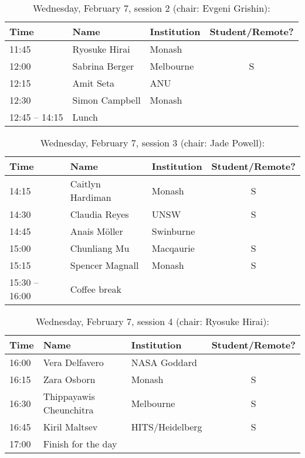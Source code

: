 \documentclass[amsmath,onecolumn]{revtex4-1}
\begin{document}
\begin{table}[!htbp]
	\centering
	\caption{Wednesday, February 7, session 2 (chair: Evgeni Grishin):}
\begin{tabular}{| l | l | l | c |}
	\hline
	Time & Name  & Institution & Student/Remote? \\ 		
	\hline
	11:45 & Ryosuke	Hirai & Monash & \\
	12:00 & Sabrina	Berger & Melbourne & S \\
	12:15 & Amit Seta & ANU & \\
	12:30 & Simon	Campbell & Monash & \\
	\hline
	12:45 -- 14:15 & Lunch & &  \\
	\hline
\end{tabular}
\end{table}

\begin{table}[!htbp]
	\centering
	\caption{Wednesday, February 7, session 3 (chair: Jade Powell):}
\begin{tabular}{| l | l | l | c |}
	\hline
	Time & Name  & Institution & Student/Remote? \\ 		
	\hline
	14:15& Caitlyn	Hardiman & Monash & S \\
	14:30 & Claudia Reyes & UNSW & S \\
	14:45 &  Anais	Möller & Swinburne & \\
	15:00 & Chunliang	Mu & Macqaurie & S \\
	15:15 & Spencer	Magnall & Monash & S\\	
	\hline
	15:30 -- 16:00 & Coffee break & & \\
	\hline
\end{tabular}
\end{table}
	
\begin{table}[!htbp]
	\centering
	\caption{Wednesday, February 7, session 4 (chair: Ryosuke Hirai):}
\begin{tabular}{| l | l | l | c |}
	\hline
	Time & Name  & Institution & Student/Remote? \\ 		
	\hline
	16:00 & Vera	Delfavero & NASA Goddard & \\
	16:15 & Zara	Osborn & Monash & S \\
	16:30 & Thippayawis 	Cheunchitra & Melbourne & S\\
	16:45 & Kiril	Maltsev & HITS/Heidelberg & S\\
	\hline
	17:00 & Finish for the day & & \\
	\hline
\end{tabular}
\end{table}
\end{document}
